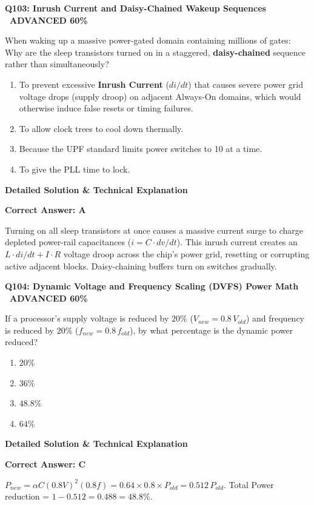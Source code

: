 \documentclass[11pt,a4paper]{article}
\newcommand{\badgeadv}{{\color{white}\colorbox{advred}{\bfseries\sffamily\tiny\ ADVANCED 60\%\ }}}
\newenvironment{qbox}[2]{%
  \begin{mdframed}[style=qstyle]%
  {\bfseries\sffamily\color{primaryblue}#1 \hfill #2}\par\vspace{2pt}%
}{%
  \end{mdframed}%
}
\newenvironment{ansbox}{%
  \begin{mdframed}[style=ansstyle]%
  {\bfseries\sffamily\color{ansgreen}\small Detailed Solution \& Technical Explanation}\par\vspace{2pt}\small%
}{%
  \end{mdframed}%
}
\begin{document}
\begin{qbox}{Q103: Inrush Current and Daisy-Chained Wakeup Sequences}{\badgeadv}
When waking up a massive power-gated domain containing millions of gates:
Why are the sleep transistors turned on in a staggered, \textbf{daisy-chained} sequence rather than simultaneously?
\begin{enumerate}[label=\textbf{\Alph*.}]
  \item To prevent excessive \textbf{Inrush Current} ($di/dt$) that causes severe power grid voltage drops (supply droop) on adjacent Always-On domains, which would otherwise induce false resets or timing failures.
  \item To allow clock trees to cool down thermally.
  \item Because the UPF standard limits power switches to 10 at a time.
  \item To give the PLL time to lock.
\end{enumerate}
\end{qbox}
\begin{ansbox}
\textbf{Correct Answer: A}

Turning on all sleep transistors at once causes a massive current surge to charge depleted power-rail capacitances ($i = C \cdot dv/dt$). This inrush current creates an $L \cdot di/dt + I \cdot R$ voltage droop across the chip's power grid, resetting or corrupting active adjacent blocks. Daisy-chaining buffers turn on switches gradually.
\end{ansbox}

\begin{qbox}{Q104: Dynamic Voltage and Frequency Scaling (DVFS) Power Math}{\badgeadv}
If a processor's supply voltage is reduced by $20\%$ ($V_{new} = 0.8\,V_{old}$) and frequency is reduced by $20\%$ ($f_{new} = 0.8\,f_{old}$), by what percentage is the dynamic power reduced?
\begin{enumerate}[label=\textbf{\Alph*.}]
  \item $20\%$
  \item $36\%$
  \item $48.8\%$
  \item $64\%$
\end{enumerate}
\end{qbox}
\begin{ansbox}
\textbf{Correct Answer: C}

$P_{new} = \alpha C (0.8 V)^2 (0.8 f) = 0.64 \times 0.8 \times P_{old} = 0.512 \, P_{old}$.  
Total Power reduction = $1 - 0.512 = 0.488 = 48.8\%$.
\end{ansbox}
\end{document}
